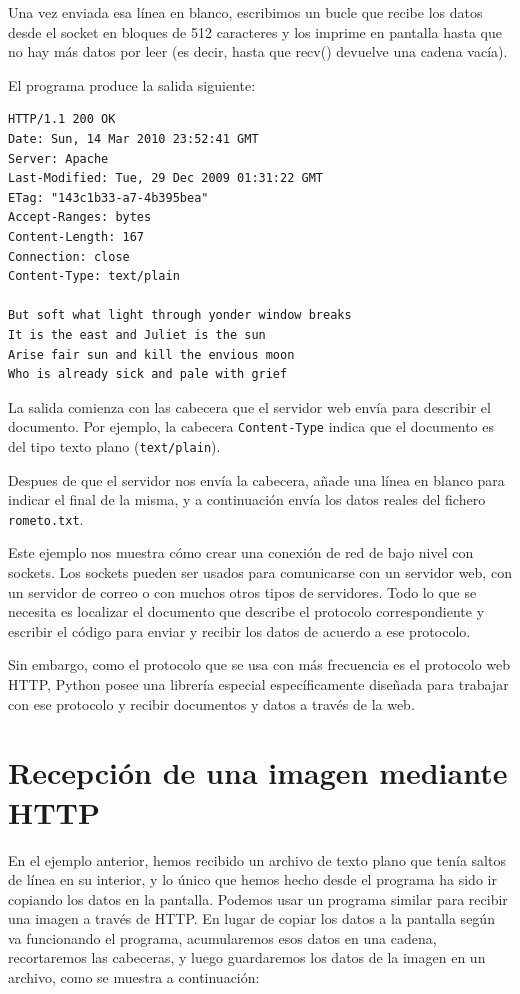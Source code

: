 Una vez enviada esa línea en blanco, escribimos un bucle que recibe los datos
desde el socket en bloques de 512 caracteres y los imprime en pantalla
hasta que no hay más datos por leer (es decir, hasta que recv() devuelve
una cadena vacía).

El programa produce la salida siguiente:

\beforeverb
\begin{verbatim}
HTTP/1.1 200 OK
Date: Sun, 14 Mar 2010 23:52:41 GMT
Server: Apache
Last-Modified: Tue, 29 Dec 2009 01:31:22 GMT
ETag: "143c1b33-a7-4b395bea"
Accept-Ranges: bytes
Content-Length: 167
Connection: close
Content-Type: text/plain

But soft what light through yonder window breaks
It is the east and Juliet is the sun
Arise fair sun and kill the envious moon
Who is already sick and pale with grief
\end{verbatim}
\afterverb
%
La salida comienza con las cabecera que el servidor web envía
para describir el documento.
Por ejemplo, la cabecera {\tt Content-Type} indica que
el documento es del tipo texto plano ({\tt text/plain}).

Despues de que el servidor nos envía la cabecera, añade una línea en blanco
para indicar el final de la misma, y a continuación envía los datos
reales del fichero {\tt rometo.txt}.

Este ejemplo nos muestra cómo crear una conexión de red de bajo nivel
con sockets. Los sockets pueden ser usados para comunicarse con un servidor
web, con un servidor de correo o con muchos otros tipos de servidores.
Todo lo que se necesita es localizar el documento que describe
el protocolo correspondiente y escribir el código para enviar y recibir los datos
de acuerdo a ese protocolo.

Sin embargo, como el protocolo que se usa con más frecuencia es
el protocolo web HTTP, Python posee una librería
especial específicamente diseñada para trabajar con ese protocolo
y recibir documentos y datos a través de la web.

\section{Recepción de una imagen mediante HTTP}

En el ejemplo anterior, hemos recibido un archivo de texto plano
que tenía saltos de línea en su interior, y lo único que hemos hecho
desde el programa ha sido ir copiando los datos en la pantalla. Podemos usar un programa
similar para recibir una imagen a través de HTTP. En lugar
de copiar los datos a la pantalla según va funcionando el programa,
acumularemos esos datos en una cadena, recortaremos las cabeceras,
y luego guardaremos los datos de la imagen en un archivo, como se muestra a continuación:

